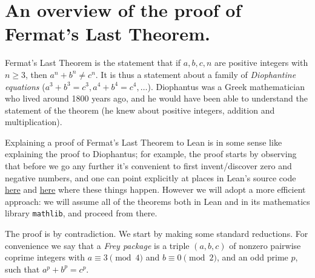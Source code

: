 \chapter{An overview of the proof of Fermat's Last Theorem.}

Fermat's Last Theorem is the statement that if $a,b,c,n$ are positive integers with $n\geq 3$, then $a^n+b^n\not=c^n$. It is thus a statement about a family of \emph{Diophantine equations} ($a^3+b^3=c^3, a^4+b^4=c^4,\ldots$). Diophantus was a Greek mathematician who lived around 1800 years ago, and he would have been able to understand the statement of the theorem (he knew about positive integers, addition and multiplication).

Explaining a proof of Fermat's Last Theorem to Lean is in some sense like explaining the proof to Diophantus; for example, the proof starts by observing that before we go any further it's convenient to first invent/discover zero and negative numbers, and one can point explicitly at places in Lean's source code \href{https://github.com/leanprover/lean4/blob/260eaebf4e804c9ac1319532970544a4e157c336/src/Init/Prelude.lean#L1049}{here} and \href{https://github.com/leanprover/lean4/blob/260eaebf4e804c9ac1319532970544a4e157c336/src/Init/Data/Int/Basic.lean#L45}{here} where these things happen. However we will adopt a more efficient approach: we will assume all of the theorems both in Lean and in its mathematics library {\tt mathlib}, and proceed from there. 

The proof is by contradiction. We start by making some standard reductions. For convenience we say that a \emph{Frey package} is a triple $(a,b,c)$ of nonzero pairwise coprime integers with $a\equiv3\pmod4$ and $b\equiv0\pmod2$, and an odd prime $p$, such that $a^p+b^p=c^p$.

